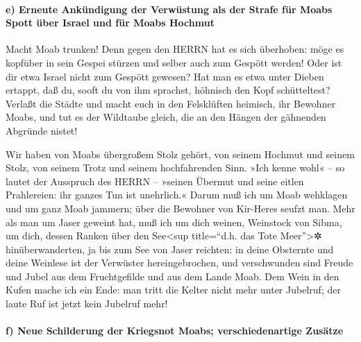 \hypertarget{e-erneute-ankuxfcndigung-der-verwuxfcstung-als-der-strafe-fuxfcr-moabs-spott-uxfcber-israel-und-fuxfcr-moabs-hochmut}{%
\paragraph{e) Erneute Ankündigung der Verwüstung als der Strafe für
Moabs Spott über Israel und für Moabs
Hochmut}\label{e-erneute-ankuxfcndigung-der-verwuxfcstung-als-der-strafe-fuxfcr-moabs-spott-uxfcber-israel-und-fuxfcr-moabs-hochmut}}

Macht Moab trunken! Denn gegen den HERRN hat es sich
überhoben: möge es kopfüber in sein Gespei stürzen und selber auch zum
Gespött werden! Oder ist dir etwa Israel nicht zum
Gespött gewesen? Hat man es etwa unter Dieben ertappt, daß du, sooft du
von ihm sprachst, höhnisch den Kopf schütteltest? Verlaßt
die Städte und macht euch in den Felsklüften heimisch, ihr Bewohner
Moabs, und tut es der Wildtaube gleich, die an den Hängen der gähnenden
Abgründe nistet!

Wir haben von Moabs übergroßem Stolz gehört, von seinem
Hochmut und seinem Stolz, von seinem Trotz und seinem hochfahrenden
Sinn. »Ich kenne wohl« -- so lautet der Ausspruch des
HERRN -- »seinen Übermut und seine eitlen Prahlereien: ihr ganzes Tun
ist unehrlich.« Darum muß ich um Moab wehklagen und um
ganz Moab jammern; über die Bewohner von Kir-Heres seufzt man.
Mehr als man um Jaser geweint hat, muß ich um dich
weinen, Weinstock von Sibma, um dich, dessen Ranken über den
See\textless sup title=``d.h. das Tote Meer''\textgreater✲
hinüberwanderten, ja bis zum See von Jaser reichten: in deine Obsternte
und deine Weinlese ist der Verwüster hereingebrochen, und
verschwunden sind Freude und Jubel aus dem Fruchtgefilde und aus dem
Lande Moab. Dem Wein in den Kufen mache ich ein Ende: man tritt die
Kelter nicht mehr unter Jubelruf; der laute Ruf ist jetzt kein Jubelruf
mehr!

\hypertarget{f-neue-schilderung-der-kriegsnot-moabs-verschiedenartige-zusuxe4tze}{%
\paragraph{f) Neue Schilderung der Kriegsnot Moabs; verschiedenartige
Zusätze}\label{f-neue-schilderung-der-kriegsnot-moabs-verschiedenartige-zusuxe4tze}}

